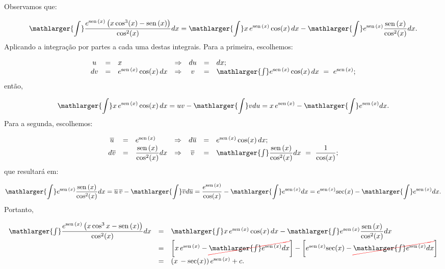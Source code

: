 \cleardoublepage\documentclass[../main.tex]{subfiles}
\begin{document}
\begin{exeresol}
\begin{compactenum}[a)]
 \begin{solution}
 Observamos que:

\[ \mathlarger{\int}\dfrac{ e^{\sen(x)}\left(x \cos^3(x) - \sen(x)\right)}{\cos^2 (x)} dx=\mathlarger{\int}x\,e^{\sen(x)} \cos (x)\,dx - \mathlarger{\int} e^{\sen(x) }\dfrac{\sen(x) }{\cos^2 (x)} dx. \]
Aplicando a integração por partes a cada uma destas integrais. Para a primeira, escolhemos:

\[ \begin{array}{cclcccl} u &=& x&\Rightarrow&du &=& dx;\\ dv &=& e^{\sen(x)} \cos(x)\, dx&\Rightarrow& v &=& \mathlarger{\int} e^{\sen(x)} \cos (x)\, dx \,\, =\,\,e^{\sen(x)}; \end{array} \]
então,

\[ \mathlarger{\int}x\,e^{\sen(x)} \cos (x)\,dx = uv -\mathlarger{\int} vdu = x \,e^{\sen(x)}- \mathlarger{\int} e^{\sen(x)} dx. \]
Para a segunda, escolhemos:

\[ \begin{array}{cclcccl} \overline{u} &=& e^{\sen(x)}&\Rightarrow& d\overline{u} &=& e^{\sen(x)} \cos (x)\,dx;\\ d \overline{v} &=& \dfrac{\sen(x)}{ \cos^2 (x)} dx&\Rightarrow& \overline{v} &=& \mathlarger{\int} \dfrac{\sen(x)}{ \cos^2 (x)} dx \,\, =\,\,\dfrac{1}{\cos (x)}; \end{array} \]
que resultará em:

\[ \mathlarger{\int} e^{\sen(x) }\dfrac{\sen(x) }{\cos^2 (x)} dx = \overline{u} \, \overline{v}-\mathlarger{\int} \overline{v} d\overline{u} = \dfrac{e^{\sen(x)}}{\cos (x)}- \mathlarger{\int} e^{\sen(x)} dx = e^{\sen(x)}{\rm sec}(x) - \mathlarger{\int} e^{\sen(x)} dx. \]
Portanto,

\[ \begin{array}{rcl} \mathlarger{\int}\dfrac{ e^{\sen(x)}\left(x \cos^3 x - \sen(x)\right)}{\cos^2 (x)} dx &=& \mathlarger{\int}x\,e^{\sen(x)} \cos (x)\,dx - \mathlarger{\int} e^{\sen(x) }\dfrac{\sen(x) }{\cos^2 (x)} dx\\ &=&\left[ x\, e^{\sen(x)} - \Ccancel[red]{\mathlarger{\int} e^{\sen(x)} dx} \right] - \left[e^{\sen(x)}{\rm sec}(x) - \Ccancel[red]{\mathlarger{\int} e^{\sen(x)} dx} \right]\\ &=& \left(x\, - {\rm sec}(x)\right) e^{\sen(x)} +c. \end{array} \]
 \end{solution}
  \end{compactenum}
  \end{exeresol}
\end{document}

